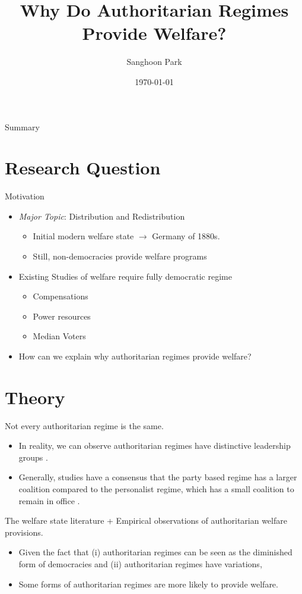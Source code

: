 \documentclass{Bredelebeamer}
\title{Why Do Authoritarian Regimes Provide Welfare?}
\author{Sanghoon Park \inst{1}}
\institute[University of South Carolina]
{
  \inst{1}%
  University of South Carolina\\Department of Political Science}
\date{\today}
\begin{document}
\begin{frame}
  \titlepage
\end{frame}

\begin{frame}{Summary}
  \tableofcontents[hideallsubsections]
\end{frame}

\section{Research Question}
\begin{frame}{Motivation}
	\begin{itemize}
		\item \textit{Major Topic}: Distribution and Redistribution
		\begin{itemize}
			\item Initial modern welfare state \pause $\rightarrow$ Germany of 1880s.
			\item Still, non-democracies provide welfare programs
		\end{itemize} \pause
		\item Existing Studies of welfare require fully democratic regime \pause
		\begin{itemize}
			\item Compensations \citep{Boix2001a,Adsera2002} 
			\item Power resources \citep{Huber1993,Bradley2003,Lupu2011,Lim2016} 
			\item Median Voters \citep{Meltzer1981,Iversen2006} 
		\end{itemize}\pause
		\item How can we explain why authoritarian regimes provide welfare?
	\end{itemize}	
\end{frame}

\section{Theory}
\begin{frame}{Not every authoritarian regime is the	same.}
\begin{itemize}
	\item In reality, we can observe authoritarian regimes have distinctive leadership groups \citep{Geddes2014}. 
	\item Generally, studies have a consensus that the party based regime has a larger
	coalition compared to the personalist regime, which has a small coalition to remain in office \citep{Levitsky2002,Levitsky2010,Gandhi2009}.
\end{itemize}
The welfare state literature + Empirical observations of authoritarian welfare provisions.
\begin{itemize}
	\item Given the fact that (i) authoritarian regimes can be seen as the diminished form of democracies and (ii) authoritarian regimes have variations,
	\item Some forms of authoritarian regimes are more likely to provide welfare.
\end{itemize}

\end{frame}
\end{document}
